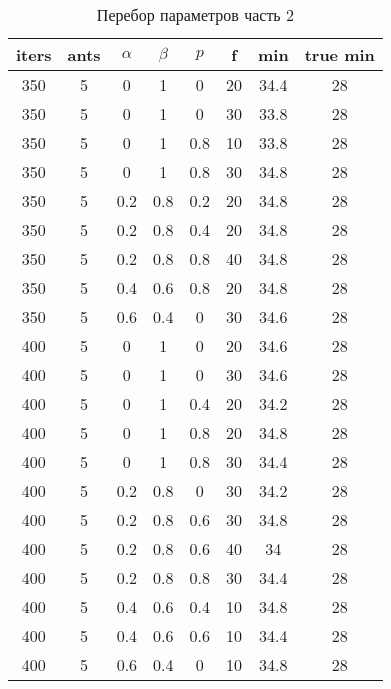 \begin{table}[ph!]
  \begin{center}
    \captionsetup{justification=raggedright}
     \caption{Перебор параметров часть 2}
    \label{tab:workcost_classic}
    \begin{tabular}{c|c|c|c|c|c|c|c}
      \textbf{iters} & \textbf{ants}  & \textbf{$\alpha$}  & \textbf{$\beta$} & \textbf{$p$} & \textbf{f}  & \textbf{min}  & \textbf{true min}\\
      \hline	
	350 & 5 & 0 & 1 & 0 & 20 & 34.4 & 28\\
	350 & 5 & 0 & 1 & 0 & 30 & 33.8 & 28\\
	350 & 5 & 0 & 1 & 0.8 & 10 & 33.8 & 28\\
	350 & 5 & 0 & 1 & 0.8 & 30 & 34.8 & 28\\
	350 & 5 & 0.2 & 0.8 & 0.2 & 20 & 34.8 & 28\\
	350 & 5 & 0.2 & 0.8 & 0.4 & 20 & 34.8 & 28\\
	350 & 5 & 0.2 & 0.8 & 0.8 & 40 & 34.8 & 28\\
	350 & 5 & 0.4 & 0.6 & 0.8 & 20 & 34.8 & 28\\
	350 & 5 & 0.6 & 0.4 & 0 & 30 & 34.6 & 28\\
	400 & 5 & 0 & 1 & 0 & 20 & 34.6 & 28\\
	400 & 5 & 0 & 1 & 0 & 30 & 34.6 & 28\\
	400 & 5 & 0 & 1 & 0.4 & 20 & 34.2 & 28\\
	400 & 5 & 0 & 1 & 0.8 & 20 & 34.8 & 28\\
	400 & 5 & 0 & 1 & 0.8 & 30 & 34.4 & 28\\
	400 & 5 & 0.2 & 0.8 & 0 & 30 & 34.2 & 28\\
	400 & 5 & 0.2 & 0.8 & 0.6 & 30 & 34.8 & 28\\
	400 & 5 & 0.2 & 0.8 & 0.6 & 40 & 34 & 28\\
	400 & 5 & 0.2 & 0.8 & 0.8 & 30 & 34.4 & 28\\
	400 & 5 & 0.4 & 0.6 & 0.4 & 10 & 34.8 & 28\\
	400 & 5 & 0.4 & 0.6 & 0.6 & 10 & 34.4 & 28\\
	400 & 5 & 0.6 & 0.4 & 0 & 10 & 34.8 & 28\\
    \end{tabular}
  \end{center}
\end{table}

